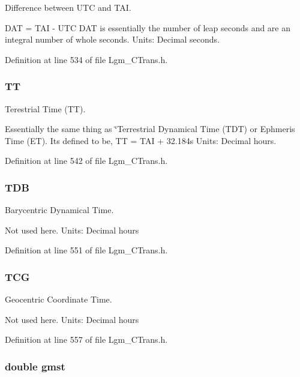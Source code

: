 Difference between UTC and TAI. 

DAT = TAI - UTC DAT is essentially the number of leap seconds and are an integral number of whole seconds. Units: Decimal seconds. 

Definition at line 534 of file Lgm\_\-CTrans.h.\hypertarget{struct_lgm___c_trans_a4afe0bafc4dfef674b987e38ab8d80e}{
\subsubsection[{TT}]{ {\bf TT}}}
\label{struct_lgm___c_trans_a4afe0bafc4dfef674b987e38ab8d80e}


Terestrial Time (TT). 

Essentially the same thing as \char`\"{}Terrestrial Dynamical Time (TDT) or Ephmeris Time (ET). Its defined to be, TT = TAI + 32.184s Units: Decimal hours. 

Definition at line 542 of file Lgm\_\-CTrans.h.\hypertarget{struct_lgm___c_trans_3c24ba5a6818123e311c951847bb90c9}{
\subsubsection[{TDB}]{ {\bf TDB}}}
\label{struct_lgm___c_trans_3c24ba5a6818123e311c951847bb90c9}


Barycentric Dynamical Time. 

Not used here. Units: Decimal hours 

Definition at line 551 of file Lgm\_\-CTrans.h.\hypertarget{struct_lgm___c_trans_dcdd22f97d548861fcdd7f6912e39ecf}{
\subsubsection[{TCG}]{ {\bf TCG}}}
\label{struct_lgm___c_trans_dcdd22f97d548861fcdd7f6912e39ecf}


Geocentric Coordinate Time. 

Not used here. Units: Decimal hours 

Definition at line 557 of file Lgm\_\-CTrans.h.\hypertarget{struct_lgm___c_trans_ba7b3bce77fb692f5e3119488e703c8c}{
\subsubsection[{gmst}]{\setlength{\rightskip}{0pt plus 5cm}double {\bf gmst}}}
\label{struct_lgm___c_trans_ba7b3bce77fb692f5e3119488e703c8c}


